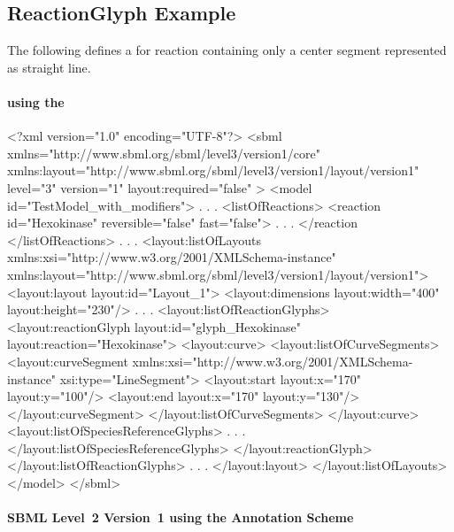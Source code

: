 \subsection{ReactionGlyph Example}
The following defines a \ReactionGlyph for reaction  
containing only a center segment represented as straight line. 

\label{example:reactionglyph}
\paragraph{\sbmlthreecore using the \LayoutPackage}
\begin{example}
<?xml version="1.0" encoding="UTF-8"?>
<sbml xmlns="http://www.sbml.org/sbml/level3/version1/core" 
		xmlns:layout="http://www.sbml.org/sbml/level3/version1/layout/version1" 
		level="3" version="1" layout:required="false" >		
  <model id="TestModel_with_modifiers">
                .
                .
                .
    <listOfReactions>
      <reaction id="Hexokinase" reversible="false" fast="false">
                .
                .
                .
      </reaction
    </listOfReactions>
                .
                .
                .
     <layout:listOfLayouts xmlns:xsi="http://www.w3.org/2001/XMLSchema-instance" 
		xmlns:layout="http://www.sbml.org/sbml/level3/version1/layout/version1">
      <layout:layout layout:id="Layout_1">
        <layout:dimensions layout:width="400" layout:height="230"/>
                .
                .
                .
        <layout:listOfReactionGlyphs>
          <layout:reactionGlyph layout:id="glyph_Hexokinase" layout:reaction="Hexokinase">
            <layout:curve>
              <layout:listOfCurveSegments>
                <layout:curveSegment 
					xmlns:xsi="http://www.w3.org/2001/XMLSchema-instance" 
					xsi:type="LineSegment">
                  <layout:start layout:x="170" layout:y="100"/>
                  <layout:end layout:x="170" layout:y="130"/>
                </layout:curveSegment>
              </layout:listOfCurveSegments>
            </layout:curve>
            <layout:listOfSpeciesReferenceGlyphs>
                .
                .
                .
            </layout:listOfSpeciesReferenceGlyphs>
          </layout:reactionGlyph>
        </layout:listOfReactionGlyphs>
                .
                .
                .
			</layout:layout>
		</layout:listOfLayouts>
  </model>
</sbml>
\end{example}
\paragraph{SBML Level~2 Version~1 using the Annotation Scheme}

